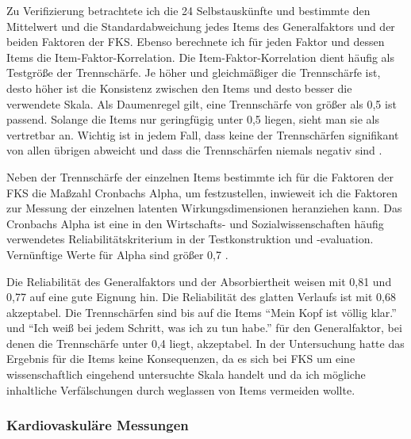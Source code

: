 Zu Verifizierung betrachtete ich die 24 Selbstauskünfte und bestimmte den Mittelwert und die Standardabweichung jedes Items des Generalfaktors und der beiden Faktoren der \ac{FKS}. Ebenso berechnete ich für jeden Faktor und dessen Items die Item-Faktor-Korrelation. Die Item-Faktor-Korrelation dient häufig als Testgröße der Trennschärfe. Je höher und gleichmäßiger die Trennschärfe ist, desto höher ist die Konsistenz zwischen den Items und desto besser die verwendete Skala. Als Daumenregel gilt, eine Trennschärfe von größer als 0,5 ist passend. Solange die Items nur geringfügig unter 0,5 liegen, sieht man sie als vertretbar an. Wichtig ist in jedem Fall, dass keine der Trennschärfen signifikant von allen übrigen abweicht und dass die Trennschärfen niemals negativ sind \citep[vgl.][S.~219f.]{Bortz2006}.

Neben der Trennschärfe der einzelnen Items bestimmte ich für die Faktoren der \ac{FKS} die Maßzahl Cronbachs Alpha, um festzustellen, inwieweit ich die Faktoren zur Messung der einzelnen latenten Wirkungsdimensionen heranziehen kann. Das Cronbachs Alpha ist eine in den Wirtschafts- und Sozialwissenschaften häufig verwendetes Reliabilitätskriterium in der Testkonstruktion und -evaluation. Vernünftige Werte für Alpha sind größer 0,7 \citep[vgl.][S.~189f.]{Bortz2006}.

Die Reliabilität des Generalfaktors und der Absorbiertheit weisen mit 0,81 und 0,77 auf eine gute Eignung hin. Die Reliabilität des glatten Verlaufs ist mit 0,68 akzeptabel. Die Trennschärfen sind bis auf die Items "`Mein Kopf ist völlig klar."' und "`Ich weiß bei jedem Schritt, was ich zu tun habe."' für den Generalfaktor, bei denen die Trennschärfe unter 0,4 liegt, akzeptabel. In der Untersuchung hatte das Ergebnis für die Items keine Konsequenzen, da es sich bei \ac{FKS} um eine wissenschaftlich eingehend untersuchte Skala handelt und da ich mögliche inhaltliche Verfälschungen durch weglassen von Items vermeiden wollte.

\subsubsection{Kardiovaskuläre Messungen}
\label{ssub:kardiovaskulaere_messungen_1}

